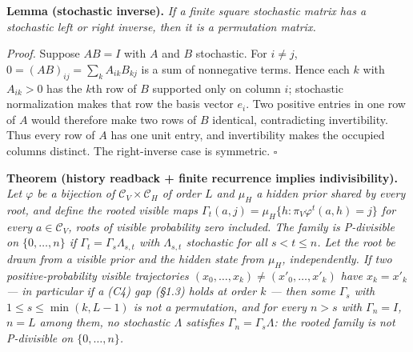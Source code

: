 \documentclass[
]{article}
\begin{document}
\textbf{Lemma (stochastic inverse).} \emph{If a finite square stochastic
matrix has a stochastic left or right inverse, then it is a permutation
matrix.}

\emph{Proof.} Suppose \(AB=I\) with \(A\) and \(B\) stochastic. For
\(i\neq j\), \(0=(AB)_{ij}=\sum_k A_{ik}B_{kj}\) is a sum of nonnegative
terms. Hence each \(k\) with \(A_{ik}>0\) has the \(k\)th row of \(B\)
supported only on column \(i\); stochastic normalization makes that row
the basis vector \(e_i\). Two positive entries in one row of \(A\) would
therefore make two rows of \(B\) identical, contradicting invertibility.
Thus every row of \(A\) has one unit entry, and invertibility makes the
occupied columns distinct. The right-inverse case is symmetric.
\(\square\)

\textbf{Theorem (history readback + finite recurrence implies
indivisibility).} \emph{Let \(\varphi\) be a bijection of
\(\mathcal{C}_V \times \mathcal{C}_H\) of order \(L\) and \(\mu_H\) a
hidden prior shared by every root, and define the rooted visible maps
\(\Gamma_t(a, j) = \mu_H\{h : \pi_V \varphi^t(a, h) = j\}\) for every
\(a \in \mathcal{C}_V\), roots of visible probability zero included. The
family is P-divisible on \(\{0, \ldots, n\}\) if
\(\Gamma_t = \Gamma_s \Lambda_{s,t}\) with \(\Lambda_{s,t}\) stochastic
for all \(s < t \leq n\). Let the root be drawn from a visible prior and
the hidden state from \(\mu_H\), independently. If two
positive-probability visible trajectories
\((x_0, \ldots, x_k) \neq (x'_0, \ldots, x'_k)\) have \(x_k = x'_k\) ---
in particular if a (C4) gap (§1.3) holds at order \(k\) --- then some
\(\Gamma_s\) with \(1 \leq s \leq \min(k, L-1)\) is not a permutation,
and for every \(n > s\) with \(\Gamma_n = I\), \(n = L\) among them, no
stochastic \(\Lambda\) satisfies \(\Gamma_n = \Gamma_s \Lambda\): the
rooted family is not P-divisible on \(\{0, \ldots, n\}\).}
\end{document}
